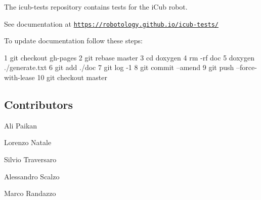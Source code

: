 The {\ttfamily icub-\/tests} repository contains tests for the i\+Cub robot.

See documentation at \href{https://robotology.github.io/icub-tests/}{\tt https\+://robotology.\+github.\+io/icub-\/tests/}

To update documentation follow these steps\+:


\begin{DoxyCode}
1 git checkout gh-pages
2 git rebase master
3 cd doxygen
4 rm -rf doc
5 doxygen ./generate.txt
6 git add ./doc
7 git log -1
8 git commit --amend
9 git push --force-with-lease
10 git checkout master
\end{DoxyCode}


\subsection*{Contributors}


\begin{DoxyItemize}
\item Ali Paikan
\item Lorenzo Natale
\item Silvio Traversaro
\item Alessandro Scalzo
\item Marco Randazzo 
\end{DoxyItemize}